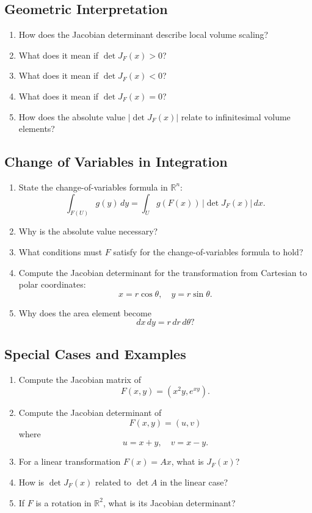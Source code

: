 \subsection{Geometric Interpretation}
\begin{enumerate}[resume]
  \item How does the Jacobian determinant describe local volume scaling?
  \item What does it mean if $\det J_F(x) > 0$?
  \item What does it mean if $\det J_F(x) < 0$?
  \item What does it mean if $\det J_F(x) = 0$?
  \item How does the absolute value $|\det J_F(x)|$ relate to infinitesimal volume elements?
\end{enumerate}

\subsection{Change of Variables in Integration}
\begin{enumerate}[resume]
  \item State the change-of-variables formula in $\mathbb{R}^n$:
    \[
      \int_{F(U)} g(y)\,dy
      =
      \int_U g(F(x))\, |\det J_F(x)| \, dx.
    \]
  \item Why is the absolute value necessary?
  \item What conditions must $F$ satisfy for the change-of-variables formula to hold?
  \item Compute the Jacobian determinant for the transformation from Cartesian to polar coordinates:
    \[
      x = r\cos\theta, \quad y = r\sin\theta.
    \]
  \item Why does the area element become
    \[
      dx\,dy = r\,dr\,d\theta?
    \]
\end{enumerate}

\subsection{Special Cases and Examples}
\begin{enumerate}[resume]
  \item Compute the Jacobian matrix of
    \[
      F(x,y) = (x^2 y, e^{xy}).
    \]
  \item Compute the Jacobian determinant of
    \[
      F(x,y) = (u,v)
    \]
    where
    \[
      u = x+y, \quad v = x-y.
    \]
  \item For a linear transformation $F(x)=Ax$, what is $J_F(x)$?
  \item How is $\det J_F(x)$ related to $\det A$ in the linear case?
  \item If $F$ is a rotation in $\mathbb{R}^2$, what is its Jacobian determinant?
\end{enumerate}

